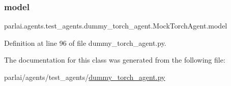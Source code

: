 \subsubsection{\texorpdfstring{model}{model}}
{\footnotesize\ttfamily parlai.\+agents.\+test\+\_\+agents.\+dummy\+\_\+torch\+\_\+agent.\+Mock\+Torch\+Agent.\+model}



Definition at line 96 of file dummy\+\_\+torch\+\_\+agent.\+py.



The documentation for this class was generated from the following file\+:\begin{DoxyCompactItemize}
\item 
parlai/agents/test\+\_\+agents/\hyperlink{dummy__torch__agent_8py}{dummy\+\_\+torch\+\_\+agent.\+py}\end{DoxyCompactItemize}
